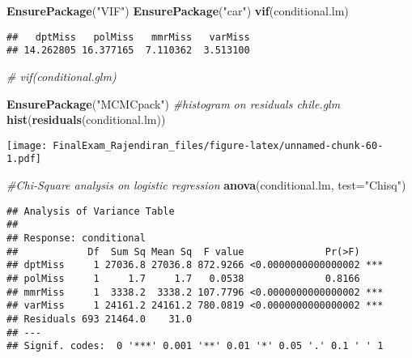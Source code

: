 \documentclass[]{article}
\newenvironment{Shaded}{\begin{snugshade}}{\end{snugshade}}
\newcommand{\CommentTok}[1]{\textcolor[rgb]{0.56,0.35,0.01}{\textit{#1}}}
\newcommand{\DataTypeTok}[1]{\textcolor[rgb]{0.13,0.29,0.53}{#1}}
\newcommand{\KeywordTok}[1]{\textcolor[rgb]{0.13,0.29,0.53}{\textbf{#1}}}
\newcommand{\NormalTok}[1]{#1}
\newcommand{\StringTok}[1]{\textcolor[rgb]{0.31,0.60,0.02}{#1}}
\begin{document}
\begin{Shaded}
\begin{Highlighting}[]
\KeywordTok{EnsurePackage}\NormalTok{(}\StringTok{"VIF"}\NormalTok{)}
\KeywordTok{EnsurePackage}\NormalTok{(}\StringTok{"car"}\NormalTok{)}
\KeywordTok{vif}\NormalTok{(conditional.lm)}
\end{Highlighting}
\end{Shaded}

\begin{verbatim}
##   dptMiss   polMiss   mmrMiss   varMiss 
## 14.262805 16.377165  7.110362  3.513100
\end{verbatim}

\begin{Shaded}
\begin{Highlighting}[]
\CommentTok{# vif(conditional.glm)}
\end{Highlighting}
\end{Shaded}

\begin{Shaded}
\begin{Highlighting}[]
\KeywordTok{EnsurePackage}\NormalTok{(}\StringTok{"MCMCpack"}\NormalTok{)}
\CommentTok{#histogram on residuals chile.glm}
\KeywordTok{hist}\NormalTok{(}\KeywordTok{residuals}\NormalTok{(conditional.lm))}
\end{Highlighting}
\end{Shaded}

\texttt{[image: FinalExam\_Rajendiran\_files/figure-latex/unnamed-chunk-60-1.pdf]}

\begin{Shaded}
\begin{Highlighting}[]
\CommentTok{#Chi-Square analysis on logistic regression}
\KeywordTok{anova}\NormalTok{(conditional.lm, }\DataTypeTok{test=}\StringTok{"Chisq"}\NormalTok{)}
\end{Highlighting}
\end{Shaded}

\begin{verbatim}
## Analysis of Variance Table
## 
## Response: conditional
##            Df  Sum Sq Mean Sq  F value              Pr(>F)    
## dptMiss     1 27036.8 27036.8 872.9266 <0.0000000000000002 ***
## polMiss     1     1.7     1.7   0.0538              0.8166    
## mmrMiss     1  3338.2  3338.2 107.7796 <0.0000000000000002 ***
## varMiss     1 24161.2 24161.2 780.0819 <0.0000000000000002 ***
## Residuals 693 21464.0    31.0                                 
## ---
## Signif. codes:  0 '***' 0.001 '**' 0.01 '*' 0.05 '.' 0.1 ' ' 1
\end{verbatim}
\end{document}
